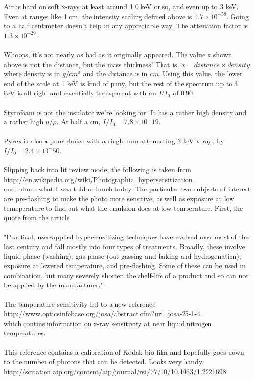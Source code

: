 \documentclass[prb,preprint]
{revtex4-1}
\begin{document}
Air is hard on soft x-rays at least around 1.0 keV or so, and even up to 3 keV.  Even at ranges like 1 cm, the intensity scaling defined above is $1.7 \times 10^{-58}$.  Going to a half centimeter doesn't help in any appreciable way.  The atteuation factor is $1.3 \times 10^{-29}$.
\\\\
Whoops, it's not nearly as bad as it originally appeared.  The value x shown above is not the distance, but the mass thickness!  That is, $x = distance \times density$ where density is in $g/cm^3$ and the distance is in $cm$.  Using this value, the lower end of the scale at 1 keV is kind of puny, but the rest of the spectrum up to 3 keV is all right and essentially transparent with an $I/I_0$ of $0.90$
\\\\
Styrofoam is not the insulator we're looking for.  It has a rather high density and a rather high $\mu / \rho$.  At half a cm, $I/I_0 = 7.8 \times 10^-19$.
\\\\
Pyrex is also a poor choice with a single mm attenuating 3 keV x-rays by $I/I_0 = 2.4 \times 10^-50$.
\\\\
Slipping back into lit review mode, the following is taken from\\ \url{http://en.wikipedia.org/wiki/Photographic_hypersensitization}
\\
and echoes what I was told at lunch today.  The particular two subjects of interest are pre-flashing to make the photo more sensitive, as well as exposure at low temeperature to find out what the emulsion does at low temperature.  First, the quote from the article
\\\\
"Practical, user-applied hypersensitizing techniques have evolved over most of the last century and fall mostly into four types of treatments. Broadly, these involve liquid phase (washing), gas phase (out-gassing and baking and hydrogenation), exposure at lowered temperature, and pre-flashing. Some of these can be used in combination, but many severely shorten the shelf-life of a product and so can not be applied by the manufacturer."
\\\\
The temperature sensitivity led to a new reference \\
\url{http://www.opticsinfobase.org/josa/abstract.cfm?uri=josa-25-1-4}
\\
which contins information on x-ray sensitivity at near liquid nitrogen temperatures.
\\\\
This reference contains a calibration of Kodak bio film and hopefully goes down to the number of photons that can be detected.  Looks very handy.
\\
\url{http://scitation.aip.org/content/aip/journal/rsi/77/10/10.1063/1.2221698}
\\
\\
\\
\newpage
\end{document}
